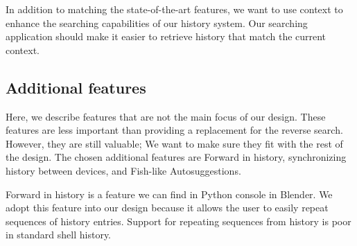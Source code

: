 

In addition to matching the state-of-the-art features, we want to use context to enhance the searching capabilities of our history system. Our searching application should make it easier to retrieve history that match the current context. 







\subsection{Additional features}

Here, we describe features that are not the main focus of our design. These features are less important than providing a replacement for the reverse search. However, they are still valuable; We want to make sure they fit with the rest of the design. 
The chosen additional features are Forward in history, synchronizing history between devices, and Fish-like Autosuggestions.




Forward in history is a feature we can find in Python console in Blender. We adopt this feature into our design because it allows the user to easily repeat sequences of history entries. Support for repeating sequences from history is poor in standard shell history.


